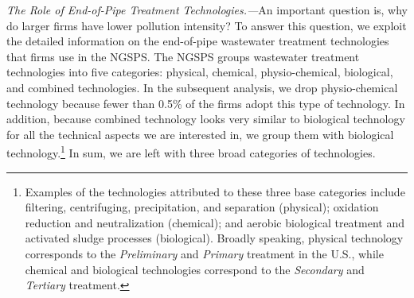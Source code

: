 \documentclass[AEJ]{AEA}
\begin{document}
\textit{The Role of End-of-Pipe Treatment Technologies.---}An important question is, why do larger firms have lower pollution intensity? To answer this question, we exploit the detailed information on the end-of-pipe wastewater treatment technologies that firms use in the NGSPS. The NGSPS groups wastewater treatment technologies into five categories: physical, chemical, physio-chemical, biological, and {combined} technologies. In the subsequent analysis, we drop {physio-chemical} technology because fewer than 0.5\% of the firms adopt this type of technology. In addition, because {combined} technology looks very similar to biological technology for all the technical aspects we are interested in, we group them with {biological} technology.\footnote{Examples of the technologies attributed to these three base categories include filtering, centrifuging, precipitation, and separation (physical); oxidation reduction and neutralization (chemical); and aerobic biological treatment and activated sludge processes (biological). Broadly speaking, physical technology corresponds to the \textit{Preliminary} and \textit{Primary} treatment in the U.S., while chemical and biological technologies correspond to the \textit{Secondary} and \textit{Tertiary} treatment.} In sum, we are left with three broad categories of technologies.
\end{document}
